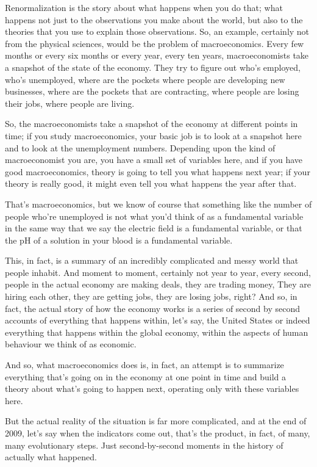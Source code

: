 \documentclass[]{article}
\begin{document}
Renormalization is the story about what happens when you do that; what happens not just to the observations you make about the world, but also to the theories that you use to explain those observations. So, an example, certainly not from the physical sciences, would be the problem of macroeconomics. Every few months or every six months or every year, every ten years, macroeconomists take a snapshot of the state of the economy. They try to figure out who's employed, who's unemployed, where are the pockets where people are developing new businesses, where are the pockets that are contracting, where people are losing their jobs, where people are living.

So, the macroeconomists take  a snapshot of the economy at different points in time; if you study macroeconomics, your basic job is to look at a snapshot here
and to look at the unemployment numbers. Depending upon the kind of 
macroeconomist you are, you have a small set of variables here, and if you have good macroeconomics, theory is going to tell you what happens next year; if your theory is really good, it might even tell you what happens the year after that.

That's macroeconomics, but we know of course that something like the number of people who're unemployed is not what you'd think of as a fundamental variable in 
the same way that we say the electric field is a fundamental variable, or that the pH of a solution in your blood is a fundamental variable.

This, in fact, is a summary of an incredibly complicated 
and messy world that  people inhabit. And moment to moment, certainly not year to year, every second, people in the actual economy are making deals, they are trading money, They are hiring each other, they are getting jobs, they are losing jobs, right? And so, in fact, the actual story of how the economy works is a series of second by second accounts of everything that happens within, let's say, the United States or indeed everything that happens within the global economy, within the aspects of human behaviour 
we think of as economic.

And so, what macroeconomics does is, in fact, an attempt is to summarize everything that's going on in the economy at one point in time and build a theory about what's going to happen next, operating only with these variables here.

But the actual reality of the situation is far more complicated, and at the end of 2009, let's say when the indicators come out, that's the product, in fact, of many, 
many evolutionary steps.  Just second-by-second moments in the history of actually what happened.
\end{document}
